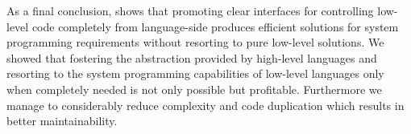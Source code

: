 As a final conclusion, \B shows that promoting clear interfaces for controlling low-level code completely from language-side produces efficient solutions for system programming requirements without resorting to pure low-level solutions.
We showed that fostering the abstraction provided by high-level languages and resorting to the system programming capabilities of low-level languages only when completely needed is not only possible but profitable.
Furthermore we manage to considerably reduce complexity and code duplication which results in better maintainability.



